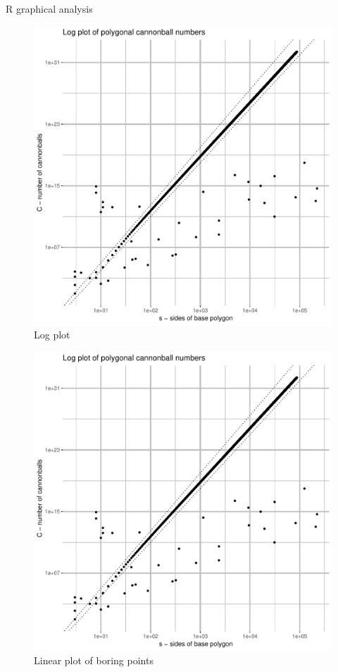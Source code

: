 \begin{longlisting}
\inputminted{R}{../graph/graph.R}
\caption{R graphical analysis}
\label{lst_R}
\end{longlisting}

\begin{figure}[H]
\centering
\includegraphics[width=\textwidth,page=1]{../graph/Rplots.pdf}
\caption{Log plot}
\label{fig_log_all}
\end{figure}

\begin{figure}[H]
\centering
\includegraphics[width=\textwidth,page=2]{../graph/Rplots.pdf}
\caption{Linear plot of boring points}
\label{fig_linear_boring}
\end{figure}

